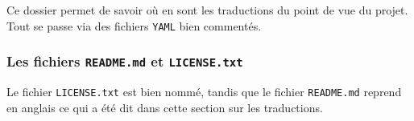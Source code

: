 \documentclass[10pt, a4paper]{../main/main}
\begin{document}
Ce dossier permet de savoir où en sont les traductions du point de vue du projet. Tout se passe via des fichiers \verb#YAML# bien commentés.



\subsubsection{Les fichiers \texttt{README.md} et \texttt{LICENSE.txt}}

Le fichier \texttt{LICENSE.txt} est bien nommé, tandis que le fichier \texttt{README.md} reprend en anglais ce qui a été dit dans cette section sur les traductions.
\end{document}
